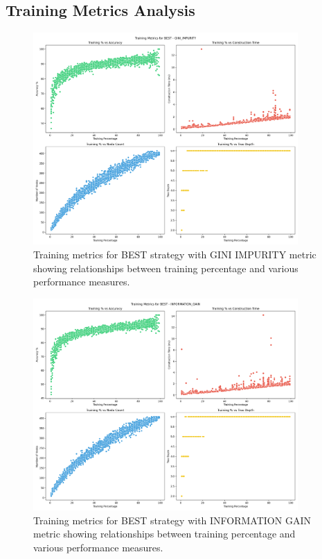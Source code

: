 \documentclass[12pt]{article}
\begin{document}
\subsection{Training Metrics Analysis}

\begin{figure}[H]
    \centering
    \includegraphics[width=0.9\textwidth]{plots/training_metrics_BEST_GINI_IMPURITY.png}
    \caption{Training metrics for BEST strategy with GINI IMPURITY metric showing relationships between training percentage and various performance measures.}
    \label{fig:training-best-gini}
\end{figure}
\newpage

\begin{figure}[H]
    \centering
    \includegraphics[width=0.9\textwidth]{plots/training_metrics_BEST_INFORMATION_GAIN.png}
    \caption{Training metrics for BEST strategy with INFORMATION GAIN metric showing relationships between training percentage and various performance measures.}
    \label{fig:training-best-ig}
\end{figure}
\newpage
\end{document}
